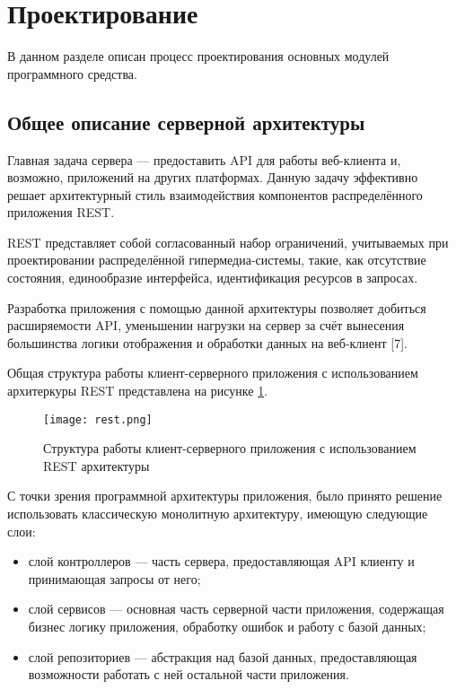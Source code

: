 \section{Проектирование}

В данном разделе описан процесс проектирования основных
модулей программного средства.

\subsection{Общее описание серверной архитектуры}
\label{sec:overview}

Главная задача сервера --- предоставить API для работы веб-клиента и, возможно,
приложений на других платформах. Данную задачу эффективно решает архитектурный 
стиль взаимодействия компонентов распределённого приложения REST.

REST представляет собой согласованный набор ограничений, учитываемых при 
проектировании распределённой гипермедиа-системы, такие, как отсутствие состояния, 
единообразие интерфейса, идентификация ресурсов в запросах. 

Разработка приложения с помощью данной архитектуры позволяет добиться расширяемости API,
уменьшении нагрузки на сервер за счёт вынесения большинства логики отображения и обработки 
данных на веб-клиент [7].

Общая структура работы клиент-серверного приложения с использованием архитеркуры 
REST представлена на рисунке \ref{fig:rest}.

\begin{figure}[h] 
  \centering  
  \texttt{[image: rest.png]}
  \caption{Структура работы клиент-серверного приложения с использованием REST архитектуры}
  \label{fig:rest}
\end{figure}

С точки зрения программной архитектуры приложения, было принято решение использовать 
классическую монолитную архитектуру, имеющую следующие слои:

\begin{itemize}
  \item слой контроллеров --- часть сервера, предоставляющая API клиенту и принимающая 
  запросы от него;
  \item слой сервисов --- основная часть серверной части приложения, содержащая бизнес логику 
  приложения, обработку ошибок и работу с базой данных;
  \item слой репозиториев --- абстракция над базой данных, предоставляющая возможности работать с ней 
  остальной части приложения.
\end{itemize}

